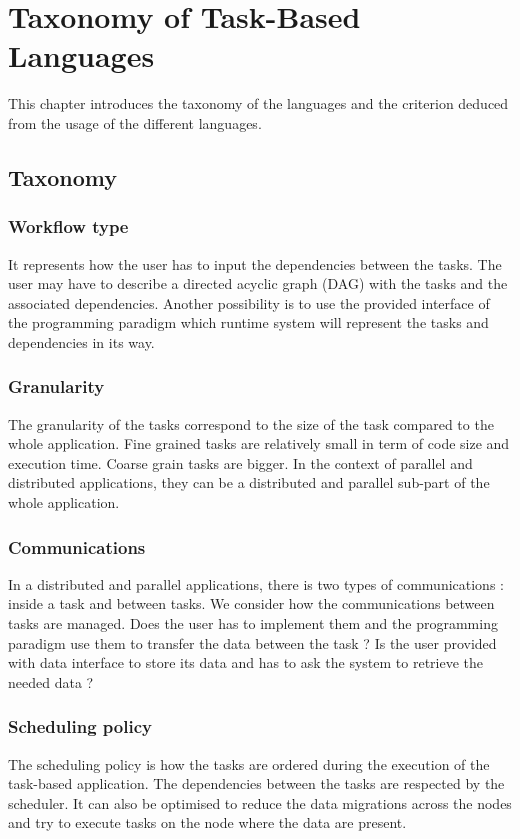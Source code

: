 \chapter{Taxonomy of Task-Based Languages}
\label{chap:taxonomy}

This chapter introduces the taxonomy of the languages and the criterion deduced from the usage of the different languages.

\section{Taxonomy}

\subsection{Workflow type}
It represents how the user has to input the dependencies between the tasks.
The user may have to describe a directed acyclic graph (DAG) with the tasks and the associated dependencies.
Another possibility is to use the provided interface of the programming paradigm which runtime system will represent the tasks and dependencies in its way.

\subsection{Granularity}
The granularity of the tasks correspond to the size of the task compared to the whole application.
Fine grained tasks are relatively small in term of code size and execution time.
Coarse grain tasks are bigger.
In the context of parallel and distributed applications, they can be a distributed and parallel sub-part of the whole application.

\subsection{Communications}
In a distributed and parallel applications, there is two types of communications : inside a task and between tasks.
We consider how the communications between tasks are managed.
Does the user has to implement them and the programming paradigm use them to transfer the data between the task ?
Is the user provided with data interface to store its data and has to ask the system to retrieve the needed data ?

\subsection{Scheduling policy}
The scheduling policy is how the tasks are ordered during the execution of the task-based application.
The dependencies between the tasks are respected by the scheduler.
It can also be optimised to reduce the data migrations across the nodes and try to execute tasks on the node where the data are present.

